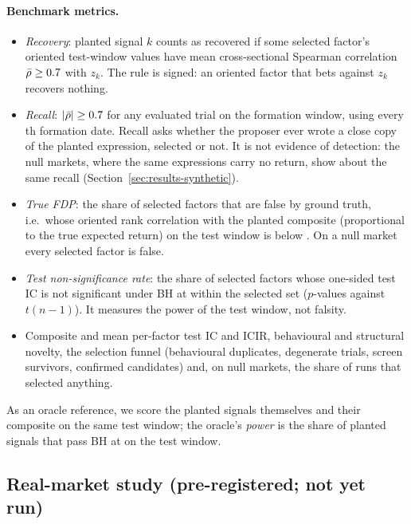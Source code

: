\paragraph{Benchmark metrics.}
\begin{itemize}
  \item \emph{Recovery}: planted signal $k$ counts as recovered if some
    selected factor's oriented test-window values have mean cross-sectional
    Spearman correlation $\bar\rho\ge0.7$ with $z_k$. The
    rule is signed: an oriented factor that bets against $z_k$ recovers
    nothing.
  \item \emph{Recall}: $|\bar\rho|\ge0.7$ for any
    evaluated trial on the formation window, using every
    \SynRecallStride{}th formation date. Recall asks whether the proposer
    ever wrote a close copy of the planted expression, selected or not. It is
    not evidence of detection: the null markets, where the same expressions
    carry no return, show about the same recall
    (Section~\ref{sec:results-synthetic}).
  \item \emph{True FDP}: the share of selected factors that are false by
    ground truth, i.e.\ whose oriented rank correlation with the planted
    composite (proportional to the true expected return) on the test window
    is below \SynTrueDiscoveryThreshold{}. On a null market every selected
    factor is false.
  \item \emph{Test non-significance rate}: the share of selected factors
    whose one-sided test IC is not significant under BH at \SynTestAlpha{}
    within the selected set ($p$-values against $t(n-1)$). It measures the
    power of the test window, not falsity.
  \item Composite and mean per-factor test IC and ICIR, behavioural and
    structural novelty, the selection funnel (behavioural duplicates,
    degenerate trials, screen survivors, confirmed candidates) and, on null
    markets, the share of runs that selected anything.
\end{itemize}
As an oracle reference, we score the planted signals themselves and their
composite on the same test window; the oracle's \emph{power} is the share of
planted signals that pass BH at \SynTestAlpha{} on the test window.

\subsection{Real-market study (pre-registered; not yet run)}
\label{sec:real}

